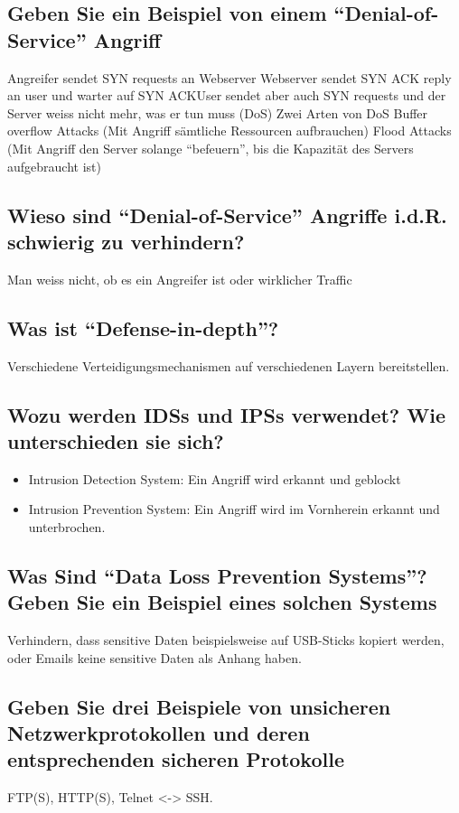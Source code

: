 \subsection*{Geben Sie ein Beispiel von einem "`Denial-of-Service"' Angriff}
Angreifer sendet SYN requests an Webserver
Webserver sendet SYN ACK reply an user und warter auf SYN ACKUser sendet aber auch SYN requests und der Server weiss nicht mehr, was er tun muss (DoS)
Zwei Arten von DoS
Buffer overflow Attacks (Mit Angriff sämtliche Ressourcen aufbrauchen)
Flood Attacks (Mit Angriff den Server solange "`befeuern"', bis die Kapazität des Servers aufgebraucht ist)

\subsection*{Wieso sind "`Denial-of-Service"' Angriffe i.d.R. schwierig zu verhindern?}
Man weiss nicht, ob es ein Angreifer ist oder wirklicher Traffic

\subsection*{Was ist "`Defense-in-depth"'?}
Verschiedene Verteidigungsmechanismen auf verschiedenen Layern bereitstellen.

\subsection*{Wozu werden IDSs und IPSs verwendet? Wie unterschieden sie sich?}
\begin{itemize}
    \item Intrusion Detection System: Ein Angriff wird erkannt und geblockt
    \item Intrusion Prevention System: Ein Angriff wird im Vornherein erkannt und unterbrochen.
\end{itemize}

\subsection*{Was Sind "`Data Loss Prevention Systems"'? Geben Sie ein Beispiel eines solchen Systems}
Verhindern, dass sensitive Daten beispielsweise auf USB-Sticks kopiert werden, oder Emails keine sensitive Daten als Anhang haben.

\subsection*{Geben Sie drei Beispiele von unsicheren Netzwerkprotokollen und deren entsprechenden sicheren Protokolle}
FTP(S), HTTP(S), Telnet <-> SSH.

